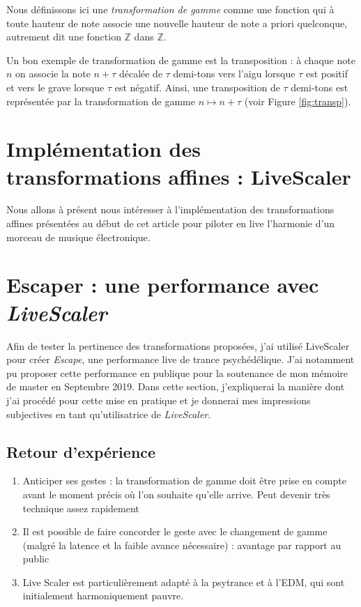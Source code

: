 \documentclass[french,11pt]{article}
\begin{document}
Nous définissons ici une \emph{transformation de gamme} comme une fonction qui à toute hauteur de note associe une nouvelle hauteur de note a priori quelconque, autrement dit une fonction $\mathbb{Z}$ dans $\mathbb{Z}$.

Un bon exemple de transformation de gamme est la transposition : à chaque note $n$ on associe la note $n+\tau$  décalée de $\tau$ demi-tons vers l'aigu lorsque $\tau$ est positif et vers le grave lorsque $\tau$ est négatif. Ainsi, une transposition de $\tau$ demi-tons est représentée par la transformation de gamme $ n \mapsto n+\tau$ (voir Figure \ref{fig:transp}).










\section{Implémentation des transformations affines : LiveScaler}
Nous allons à présent nous intéresser à l'implémentation des transformations affines présentées au début de cet article pour piloter en live l'harmonie d'un morceau de musique électronique. 









\section{Escaper : une performance avec \emph{LiveScaler} }
Afin de tester la pertinence des transformations proposées, j'ai utilisé LiveScaler pour créer \emph{Escape}, une performance live de trance psychédélique. J'ai notamment pu proposer cette performance en publique pour la soutenance de mon mémoire de master en Septembre 2019. Dans cette section, j'expliquerai la manière dont j'ai procédé pour cette mise en pratique et je donnerai mes impressions subjectives en tant qu'utilisatrice de \emph{LiveScaler}.




\subsection{Retour d'expérience}
\begin{enumerate}
  \item Anticiper ses gestes : la transformation de gamme doit être prise en compte avant le moment précis où l'on souhaite qu'elle arrive. Peut devenir très technique assez rapidement
  \item Il est possible de faire concorder le geste avec le changement de gamme (malgré la latence et la faible avance nécessaire) : avantage par rapport au public
  \item Live Scaler est particulièrement adapté à la psytrance et à l'EDM, qui sont initialement harmoniquement pauvre.
\end{enumerate}
\end{document}
